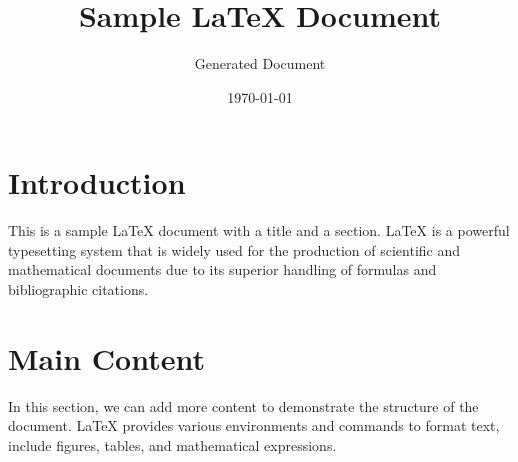 \documentclass{article}
\title{Sample LaTeX Document}
\author{Generated Document}
\date{\today}
\begin{document}
\maketitle

\section{Introduction}
This is a sample LaTeX document with a title and a section. LaTeX is a powerful typesetting system that is widely used for the production of scientific and mathematical documents due to its superior handling of formulas and bibliographic citations.

\section{Main Content}
In this section, we can add more content to demonstrate the structure of the document. LaTeX provides various environments and commands to format text, include figures, tables, and mathematical expressions.
\end{document}

